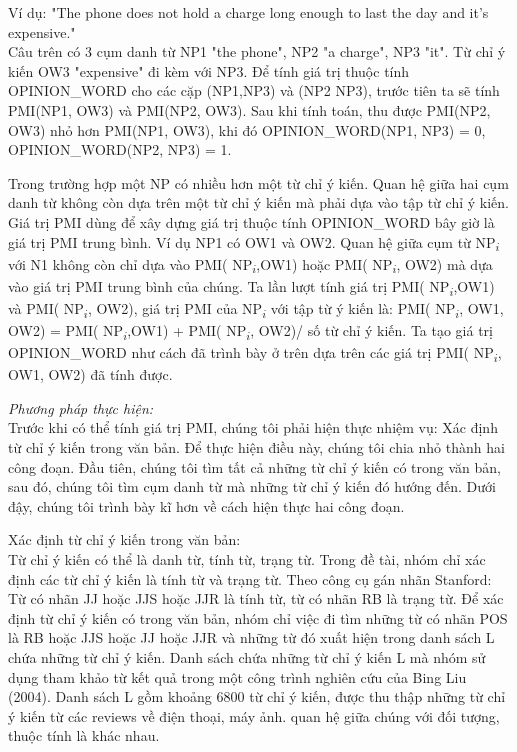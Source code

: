 \documentclass[12pt]{report}
\begin{document}
					\par Ví dụ: "The phone does not hold a charge long enough to last the day and it’s expensive."
					\\Câu trên có 3 cụm danh từ NP1 "the phone", NP2 "a charge", NP3 "it". Từ chỉ ý kiến OW3 "expensive" đi kèm với NP3. Để tính giá trị thuộc tính OPINION\_WORD cho các cặp (NP1,NP3) và (NP2 NP3), trước tiên ta sẽ tính PMI(NP1, OW3) và PMI(NP2, OW3). Sau khi tính toán, thu được PMI(NP2, OW3) nhỏ hơn PMI(NP1, OW3), khi đó OPINION\_WORD(NP1, NP3) = 0, OPINION\_WORD(NP2, NP3) = 1.
					\par Trong trường hợp một NP có nhiều hơn một từ chỉ ý kiến. Quan hệ giữa hai cụm danh từ không còn dựa trên một từ chỉ ý kiến mà phải dựa vào tập từ chỉ ý kiến. Giá trị PMI dùng để xây dựng giá trị thuộc tính OPINION\_WORD bây giờ là giá trị PMI trung bình. Ví dụ NP1 có OW1 và OW2. Quan hệ giữa cụm từ  NP\textsubscript{$i$} với N1 không còn chỉ dựa vào PMI( NP\textsubscript{$i$},OW1) hoặc PMI( NP\textsubscript{$i$}, OW2) mà dựa vào giá trị PMI trung bình của chúng. Ta lần lượt tính giá trị PMI( NP\textsubscript{$i$},OW1) và PMI( NP\textsubscript{$i$}, OW2), giá trị PMI của  NP\textsubscript{$i$} với tập từ ý kiến là:
					PMI( NP\textsubscript{$i$}, {OW1, OW2}) = PMI( NP\textsubscript{$i$},OW1) + PMI( NP\textsubscript{$i$}, OW2)/ số từ chỉ ý kiến. 
					Ta tạo giá trị OPINION\_WORD như cách đã trình bày ở trên dựa trên các giá trị PMI( NP\textsubscript{$i$}, {OW1, OW2}) đã tính được.
					\par \textit{Phương pháp thực hiện:}
					\\Trước khi có thể tính giá trị PMI, chúng tôi phải hiện thực nhiệm vụ: Xác định từ chỉ ý kiến trong văn bản. Để thực hiện điều này, chúng tôi chia nhỏ thành hai công đoạn. Đầu tiên, chúng tôi tìm tất cả những từ chỉ ý kiến có trong văn bản, sau đó, chúng tôi tìm cụm danh từ mà những từ chỉ ý kiến đó hướng đến. Dưới đậy, chúng tôi trình bày kĩ hơn về cách hiện thực hai công đoạn.
					\par Xác định từ chỉ ý kiến trong văn bản:
					\\Từ chỉ ý kiến có thể là danh từ, tính từ, trạng từ. Trong đề tài, nhóm chỉ xác định các từ chỉ ý kiến là tính từ và trạng từ. Theo công cụ gán nhãn Stanford: Từ có nhãn JJ hoặc JJS hoặc JJR là tính từ, từ có nhãn RB là trạng từ. Để xác định từ chỉ ý kiến có trong văn bản, nhóm chỉ việc đi tìm những từ có nhãn POS là RB hoặc JJS hoặc JJ hoặc JJR và những từ đó xuất hiện trong danh sách L chứa những từ chỉ ý kiến. Danh sách chứa những từ chỉ ý kiến L mà nhóm sử dụng tham khảo từ kết quả trong một công trình nghiên cứu của Bing Liu (2004)\cite{findfeatures1}. Danh sách L gồm khoảng 6800 từ chỉ ý kiến, được thu thập những từ chỉ ý kiến từ các reviews về điện thoại, máy ảnh. quan hệ giữa chúng với đối tượng, thuộc tính là khác nhau. 
\end{document}
